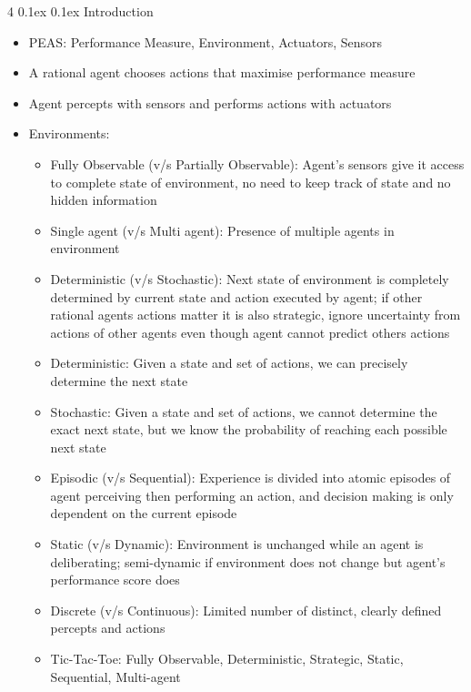 \documentclass[10pt, landscape]{article}
\makeatletter
\renewcommand{\section}{\@startsection{section}{1}{0mm}%
  {0.1ex} %
  {0.1ex} %
  {\normalfont\large\bfseries}}
\makeatother
\begin{document}
\begin{multicols*}{4}
\section{Introduction}
\begin{itemize}
    \item PEAS: Performance Measure, Environment, Actuators, Sensors
    \item A rational agent chooses actions that maximise performance measure
    \item Agent percepts with sensors and performs actions with actuators
    \item Environments:
    \begin{itemize}
        \item Fully Observable (v/s Partially Observable): Agent's sensors give it access to complete state of environment, no need to keep track of state and no hidden information
        \item Single agent (v/s Multi agent): Presence of multiple agents in environment
        \item Deterministic (v/s Stochastic): Next state of environment is completely determined by current state and action executed by agent; if other rational agents actions matter it is also strategic, ignore uncertainty from actions of other agents even though agent cannot predict others actions
        \item Deterministic: Given a state and set of actions, we can precisely determine the next state
        \item Stochastic: Given a state and set of actions, we cannot determine the exact next state, but we know the probability of reaching each possible next state
        \item Episodic (v/s Sequential): Experience is divided into atomic episodes of agent perceiving then performing an action, and decision making is only dependent on the current episode
        \item Static (v/s Dynamic): Environment is unchanged while an agent is deliberating; semi-dynamic if environment does not change but agent's performance score does
        \item Discrete (v/s Continuous): Limited number of distinct, clearly defined percepts and actions
        \item Tic-Tac-Toe: Fully Observable, Deterministic, Strategic, Static, Sequential, Multi-agent
    \end{itemize}
\end{itemize}


\end{multicols*}
\end{document}
